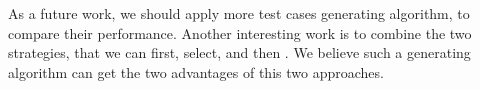 \documentclass[conference]{IEEEtran}
\theoremstyle{definition}
\begin{document}
As a future work, we should apply more test cases generating algorithm, to compare their performance. Another interesting work is to combine the two strategies, that we can first, select, and then . We believe such a generating algorithm can get the two advantages of this two approaches.

%
%



%
%
\end{document}
